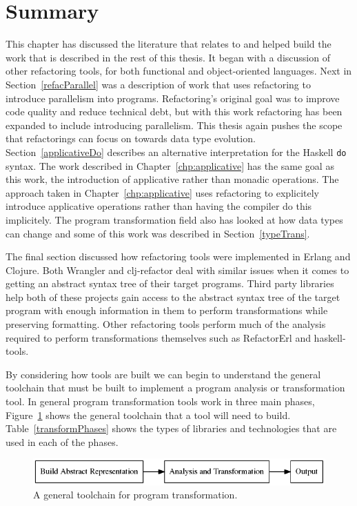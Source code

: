 \section{Summary}

This chapter has discussed the literature that relates to and helped build the work that is described in the rest of this thesis. It began with a discussion of other refactoring tools, for both functional and object-oriented languages. Next in Section~\ref{refacParallel} was a description of work that uses refactoring to introduce parallelism into programs. Refactoring's original goal was to improve code quality and reduce technical debt, but with this work refactoring has been expanded to include introducing parallelism. This thesis again pushes the scope that refactorings can focus on towards data type evolution. Section~\ref{applicativeDo} describes an alternative interpretation for the Haskell \texttt{do} syntax. The work described in Chapter~\ref{chp:applicative} has the same goal as this work, the introduction of applicative rather than monadic operations. The approach taken in Chapter~\ref{chp:applicative} uses refactoring to explicitely introduce applicative operations rather than having the compiler do this implicitely. The program transformation field also has looked at how data types can change and some of this work was described in Section~\ref{typeTrans}. 

The final section discussed how refactoring tools were implemented in Erlang and Clojure. Both Wrangler and clj-refactor deal with similar issues when it comes to getting an abstract syntax tree of their target programs. Third party libraries help both of these projects gain access to the abstract syntax tree of the target program with enough information in them to perform transformations while preserving formatting. Other refactoring tools perform much of the analysis required to perform transformations themselves such as RefactorErl and haskell-tools.

By considering how tools are built we can begin to understand the general toolchain that must be built to implement a program analysis or transformation tool. In general program transformation tools work in three main phases, Figure~\ref{generalToolchain} shows the general toolchain that a tool will need to build. Table~\ref{transformPhases} shows the types of libraries and technologies that are used in each of the phases. 

\begin{figure}[t]
	\begin{center}
		\includegraphics[scale=.4]{graphVis/RelatedWork/abstractTooling.png}
	\end{center}
	\caption{A general toolchain for program transformation.}
	\label{generalToolchain}
\end{figure}

